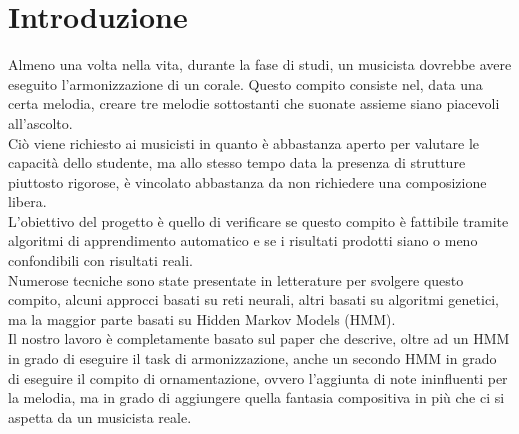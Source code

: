 \chapter{Introduzione}\label{ch:intro}

Almeno una volta nella vita, durante la fase di studi, un musicista dovrebbe avere eseguito l'armonizzazione di un corale. Questo compito consiste nel, data una certa melodia, creare tre melodie sottostanti che suonate assieme siano piacevoli all'ascolto. \\
Ciò viene richiesto ai musicisti in quanto è abbastanza aperto per valutare le capacità dello studente, ma allo stesso tempo data la presenza di strutture piuttosto rigorose, è vincolato abbastanza da non richiedere una composizione libera. \\
L'obiettivo del progetto è quello di verificare se questo compito è fattibile tramite algoritmi di apprendimento automatico e se i risultati prodotti siano o meno confondibili con risultati reali.\\
Numerose tecniche sono state presentate in letterature per svolgere questo compito, alcuni approcci basati su reti neurali, altri basati su algoritmi genetici, ma la maggior parte basati su Hidden Markov Models (HMM). \\
Il nostro lavoro è completamente basato sul paper  che descrive, oltre ad un HMM in grado di eseguire il task di armonizzazione, anche un secondo HMM in grado di eseguire il compito di ornamentazione, ovvero l'aggiunta di note ininfluenti per la melodia, ma in grado di aggiungere quella fantasia compositiva in più che ci si aspetta da un musicista reale.
